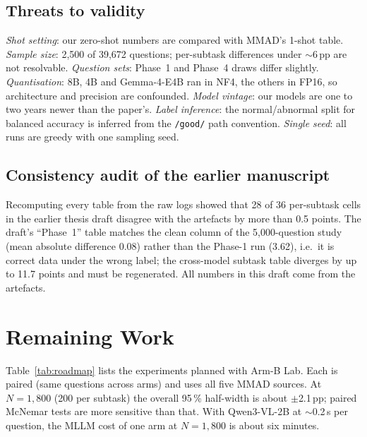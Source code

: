 \documentclass[conference]{IEEEtran}
\newcommand{\pp}{\,pp}          %
\begin{document}
\subsection{Threats to validity}

\emph{Shot setting}: our zero-shot numbers are compared with MMAD's 1-shot table.
\emph{Sample size}: 2{,}500 of 39{,}672 questions; per-subtask differences under
$\sim$6\pp{} are not resolvable. \emph{Question sets}: Phase~1 and Phase~4 draws
differ slightly. \emph{Quantisation}: 8B, 4B and Gemma-4-E4B ran in NF4, the others
in FP16, so architecture and precision are confounded. \emph{Model vintage}: our
models are one to two years newer than the paper's. \emph{Label inference}: the
normal/abnormal split for balanced accuracy is inferred from the \texttt{/good/}
path convention. \emph{Single seed}: all runs are greedy with one sampling seed.

\subsection{Consistency audit of the earlier manuscript}

Recomputing every table from the raw logs showed that 28 of 36 per-subtask cells in
the earlier thesis draft disagree with the artefacts by more than 0.5 points. The
draft's ``Phase~1'' table matches the clean column of the 5{,}000-question study
(mean absolute difference 0.08) rather than the Phase-1 run (3.62), i.e.\ it is
correct data under the wrong label; the cross-model subtask table diverges by up to
11.7 points and must be regenerated. All numbers in this draft come from the
artefacts.

\section{Remaining Work}\label{sec:roadmap}

Table~\ref{tab:roadmap} lists the experiments planned with Arm-B Lab. Each is paired
(same questions across arms) and uses all five MMAD sources. At $N{=}1{,}800$
(200 per subtask) the overall 95\,\% half-width is about $\pm$2.1\pp; paired McNemar
tests are more sensitive than that. With Qwen3-VL-2B at $\sim$0.2\,s per question,
the MLLM cost of one arm at $N{=}1{,}800$ is about six minutes.
\end{document}

